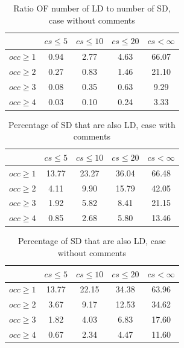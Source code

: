 \documentclass[a4paper,twoside]{article}
\begin{document}
\begin{table}[!h]
\renewcommand{\arraystretch}{1.25}
\caption{Ratio OF number of LD to number of SD, case without comments}
\label{tab:ratio:nocomm}
\centering

\begin{tabular}{|c|c|c|c|c|}
\hline
	      &	$cs\leq 5$	&	$cs\leq 10$	&	$cs\leq 20$	&	$cs< \infty$	\\
\hline
$occ\geq 1$	&	0.94	&	2.77	&	4.63	&	66.07	\\
$occ\geq 2$	&	0.27	&	0.83	&	1.46	&	21.10	\\
$occ\geq 3$	&	0.08	&	0.35	&	0.63	&	9.29	\\
$occ\geq 4$	&	0.03	&	0.10	&	0.24	&	3.33	\\
\hline
\end{tabular}
\end{table}


\begin{table}[!h]
\renewcommand{\arraystretch}{1.25}
\caption{Percentage of SD that are also LD, case with comments}
\label{tab:percSD:comm}
\centering

\begin{tabular}{|c|c|c|c|c|}
\hline
	      &	$cs\leq 5$	&	$cs\leq 10$	&	$cs\leq 20$	&	$cs< \infty$	\\
\hline
$occ\geq 1$	&	13.77	&	23.27	&	36.04	&	66.48	\\
$occ\geq 2$	&	4.11	&	9.90	&	15.79	&	42.05	\\
$occ\geq 3$	&	1.92	&	5.82	&	8.41	&	21.15	\\
$occ\geq 4$	&	0.85	&	2.68	&	5.80	&	13.46	\\
\hline
\end{tabular}
\end{table}


\begin{table}[!h]
\renewcommand{\arraystretch}{1.25}
\caption{Percentage of SD that are also LD, case without comments}
\label{tab:percSD:nocomm}
\centering

\begin{tabular}{|c|c|c|c|c|}
\hline
	      &	$cs\leq 5$	&	$cs\leq 10$	&	$cs\leq 20$	&	$cs< \infty$	\\
\hline
$occ\geq 1$	&	13.77	&	22.15	&	34.38	&	63.96	\\
$occ\geq 2$	&	3.67	&	9.17	&	12.53	&	34.62	\\
$occ\geq 3$	&	1.82	&	4.03	&	6.83	&	17.60	\\
$occ\geq 4$	&	0.67	&	2.34	&	4.47	&	11.60	\\
\hline
\end{tabular}
\end{table}
\end{document}
